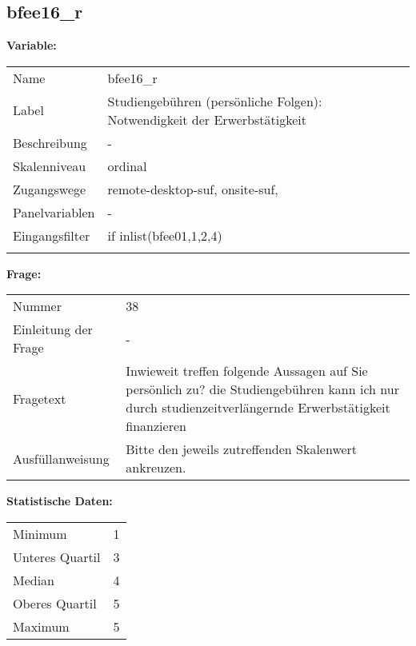 	
	
	\subsection{bfee16\_r}
	\label{subSection:bfee16_r}

	\noindent\textbf{Variable:}\\
		\begin{tabular}{lL{11.3cm}}
			\label{tableVariable:bfee16_r}
			Name & bfee16\_r \\
			Label & Studiengebühren (persönliche Folgen): Notwendigkeit der Erwerbstätigkeit \\
			Beschreibung & - \\
			Skalenniveau & ordinal \\
			Zugangswege &
				remote-desktop-suf,
				onsite-suf,
 \\
			Panelvariablen & -
			 \\
			Eingangsfilter & if inlist(bfee01,1,2,4) \\
 \\
		\end{tabular}

		\vspace*{1 cm}
		\noindent\textbf{Frage:}\\
		\begin{tabular}{lL{11.3cm}}
			\label{tableQuestion:bfee16_r}
			Nummer & 38 \\
			Einleitung der Frage & - \\
			Fragetext & Inwieweit treffen folgende Aussagen auf Sie persönlich zu?
die Studiengebühren kann ich nur durch studienzeitverlängernde Erwerbstätigkeit finanzieren \\
			Ausfüllanweisung & Bitte den jeweils zutreffenden Skalenwert ankreuzen. \\
		\end{tabular}


		\vspace*{1 cm}
		\noindent\textbf{Statistische Daten:}\\
			\begin{tabular}{ll}
				\label{tableStatistics:bfee16_r}
					Minimum & 1 \\
					Unteres Quartil & 3 \\
					Median & 4 \\
					Oberes Quartil & 5 \\
					Maximum & 5 \\
			\end{tabular}



